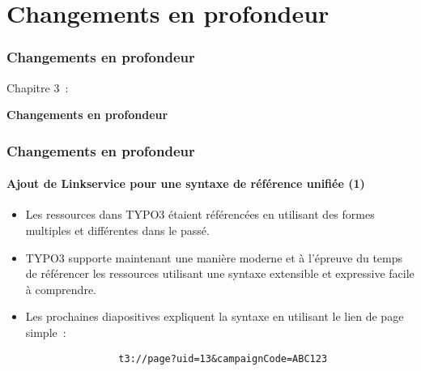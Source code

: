 %

\section{Changements en profondeur}
\begin{frame}[fragile]
	\frametitle{Changements en profondeur}

	\begin{center}\huge{Chapitre 3~:}\end{center}
	\begin{center}\huge{\color{typo3darkgrey}\textbf{Changements en profondeur}}\end{center}

\end{frame}

\begin{frame}[fragile]
	\frametitle{Changements en profondeur}
	\framesubtitle{Ajout de Linkservice pour une syntaxe de référence unifiée (1)}

	\begin{itemize}

		\item Les ressources dans TYPO3 étaient référencées en utilisant des formes multiples et différentes dans le passé.

		\item TYPO3 supporte maintenant une manière moderne et à l'épreuve du temps de référencer les ressources utilisant
			une syntaxe extensible et expressive facile à comprendre.

		\item Les prochaines diapositives expliquent la syntaxe en utilisant le lien de page simple~:

			\begin{lstlisting}
				t3://page?uid=13&campaignCode=ABC123
			\end{lstlisting}

	\end{itemize}

\end{frame}

